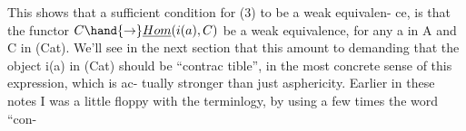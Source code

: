 This shows that a sufficient condition for (3) to be a weak equivalen-%
ce, is that the functor $C \hand{\rightarrow} \underline{Hom}(i(a),C)$ be a weak equivalence, for
any a in A and C in (Cat). We'll see in the next section\hand{*} that this amount
to demanding that the  object i(a) in (Cat) should be ``contrac%
tible'', in the most concrete sense of this  expression, which is ac-%
tually stronger than just asphericity. \hand{(}Earlier in these notes I was a 
little floppy with the terminlogy, by using a few times the word ``con-%


